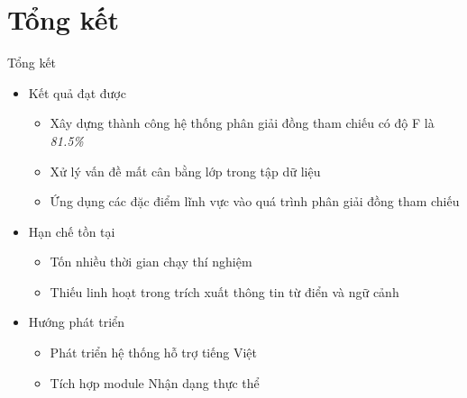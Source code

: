 \section{Tổng kết}
\begin{frame}{Tổng kết}
\putlogo
\begin{itemize}
\item Kết quả đạt được
\begin{itemize}
	\item Xây dựng thành công hệ thống phân giải đồng tham chiếu có độ F là \emph{81.5\%}
	\item Xử lý vấn đề mất cân bằng lớp trong tập dữ liệu
	\item Ứng dụng các đặc điểm lĩnh vực vào quá trình phân giải đồng tham chiếu
\end{itemize}
\item Hạn chế tồn tại
\begin{itemize}
	\item Tốn nhiều thời gian chạy thí nghiệm
	\item Thiếu linh hoạt trong trích xuất thông tin từ điển và ngữ cảnh
\end{itemize}
\item Hướng phát triển
\begin{itemize}
	\item Phát triển hệ thống hỗ trợ tiếng Việt
	\item Tích hợp module Nhận dạng thực thể
\end{itemize}
\end{itemize}
\end{frame}
